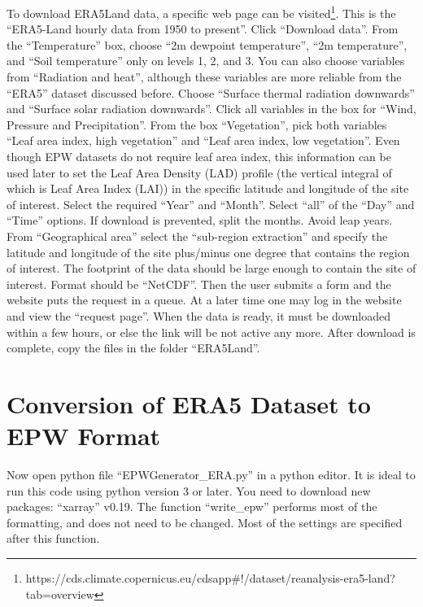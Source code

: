 \documentclass[12pt]{article}
\begin{document}
To download ERA5Land data, a specific web page can be visited\footnote{https://cds.climate.copernicus.eu/cdsapp\#!/dataset/reanalysis-era5-land?tab=overview}. This is the ``ERA5-Land hourly data from 1950 to present''. Click ``Download data''. From the ``Temperature'' box, choose ``2m dewpoint temperature'', ``2m temperature'', and ``Soil temperature'' only on levels 1, 2, and 3. You can also choose variables from ``Radiation and heat'', although these variables are more reliable from the ``ERA5'' dataset discussed before. Choose ``Surface thermal radiation downwards'' and ``Surface solar radiation downwards''. Click all variables in the box for ``Wind, Pressure and Precipitation''. From the box ``Vegetation'', pick both variables ``Leaf area index, high vegetation'' and ``Leaf area index, low vegetation''. Even though EPW datasets do not require leaf area index, this information can be used later to set the Leaf Area Density (LAD) profile (the vertical integral of which is Leaf Area Index (LAI)) in the specific latitude and longitude of the site of interest. Select the required ``Year'' and ``Month''. Select ``all'' of the ``Day'' and ``Time'' options. If download is prevented, split the months. Avoid leap years. From ``Geographical area'' select the ``sub-region extraction'' and specify the latitude and longitude of the site plus/minus one degree that contains the region of interest. The footprint of the data should be large enough to contain the site of interest. Format should be ``NetCDF''. Then the user submits a form and the website puts the request in a queue. At a later time one may log in the website and view the ``request page''. When the data is ready, it must be downloaded within a few hours, or else the link will be not active any more. After download is complete, copy the files in the folder ``ERA5Land''.

\section{Conversion of ERA5 Dataset to EPW Format}

Now open python file ``EPWGenerator\_ERA.py'' in a python editor. It is ideal to run this code using python version 3 or later. You need to download new packages: ``xarray'' v0.19. The function ``write\_epw'' performs most of the formatting, and does not need to be changed. Most of the settings are specified after this function. 
\end{document}

